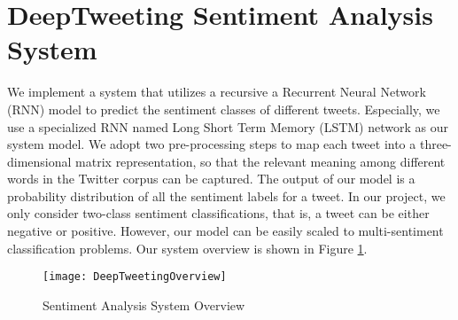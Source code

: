 
\section{DeepTweeting Sentiment Analysis System} 
We implement a system that utilizes a recursive a Recurrent Neural Network (RNN) model to predict the sentiment classes of different tweets.
%
Especially, we use a specialized RNN named Long Short Term Memory (LSTM) network as our system model.
%
We adopt two pre-processing steps to map each tweet into a three-dimensional matrix representation, so that the relevant meaning among different words in the Twitter corpus can be captured.
%
The output of our model is a probability distribution of all the sentiment labels for a tweet.
%
In our project, we only consider two-class sentiment classifications, that is, a tweet can be either negative or positive.
%
However, our model can be easily scaled to multi-sentiment classification problems. Our system overview is shown in Figure \ref{fig:systemoverview}.

\begin{figure}[htb]
	\centering
	\texttt{[image: DeepTweetingOverview]}
	\caption{Sentiment Analysis System Overview}
	\label{fig:systemoverview}
\end{figure}


%
%

%
%
%




